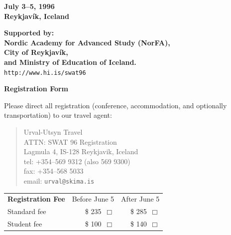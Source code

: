 \vspace{5cm}

\begin{center}
{\Large\bf
July 3--5, 1996 \\[0.2cm]
Reykjav\'ik, Iceland}

\vspace{4cm}

{\bf Supported by: \\
Nordic Academy for Advanced Study (NorFA), \\
  City of Reykjav\'ik, \\
and Ministry of Education of Iceland.} \\

\vspace{1.5cm}
{\tt http://www.hi.is/swat96}

\end{center}

\newpage

\twocolumn
\footnotesize

\begin{center}
 
{\normalsize\bf Registration Form}

\end{center}

\parskip=4pt
\parindent=0pt

Please direct all registration (conference, accommodation, and optionally
transportation) to our travel agent:

\begin{quote}
Urval-Utsyn Travel \\
ATTN: SWAT 96 Registration \\
Lagmula 4, IS-128 Reykjavik, Iceland \\
tel: +354--569 9312 (also 569 9300) \\
fax: +354--568 5033 \\
email: {\tt urval@skima.is}

\end{quote}


\begin{tabular}{lrr}
{\bf Registration Fee}	&  Before June 5	&  After June 5 \\
Standard fee		&  \$ 235\ $\Box$	&  \$ 285\ $\Box$	\\
Student fee	        &  \$ 100\ $\Box$	&  \$ 140\ $\Box$	\\
\end{tabular}

\vspace{0.2cm}

